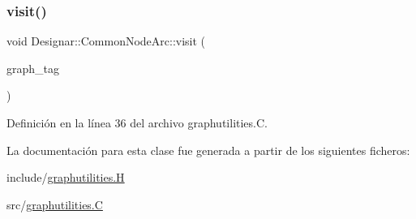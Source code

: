\mbox{\label{class_designar_1_1_common_node_arc_a14b77740fb6d68b1949483c71dd4b197}} 
\subsubsection{\texorpdfstring{visit()}{visit()}}
{\footnotesize\ttfamily void Designar\+::\+Common\+Node\+Arc\+::visit (\begin{DoxyParamCaption}\item[{\hyperlink{namespace_designar_ac91366256ea6ea6ac5fd483d55a7499e}{Graph\+Tag}}]{graph\+\_\+tag }\end{DoxyParamCaption})}



Definición en la línea 36 del archivo graphutilities.\+C.



La documentación para esta clase fue generada a partir de los siguientes ficheros\+:\begin{DoxyCompactItemize}
\item 
include/\hyperlink{graphutilities_8_h}{graphutilities.\+H}\item 
src/\hyperlink{graphutilities_8_c}{graphutilities.\+C}\end{DoxyCompactItemize}
